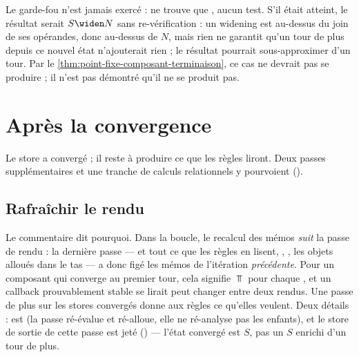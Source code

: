 \begin{piege}
Le garde-fou n'est jamais exercé :  ne trouve
que , aucun test. S'il était atteint,
le résultat serait $S \widen N$ sans re-vérification : un widening est
au-dessus du join de ses opérandes, donc au-dessus de $N$, mais rien ne
garantit qu'un tour de plus depuis ce nouvel état n'ajouterait rien ; le
résultat pourrait sous-approximer d'un tour. Par le
\cref{thm:point-fixe-composant-terminaison}, ce cas ne devrait pas se
produire ; il n'est pas démontré qu'il ne se produit pas.
\end{piege}

\section{Après la convergence}
\label{sec:point-fixe-composant-post}

Le store a convergé ; il reste à produire ce que les règles liront. Deux
passes supplémentaires et une tranche de calculs relationnels y pourvoient
().

\subsection{Rafraîchir le rendu}


Le commentaire dit pourquoi. Dans la boucle, le recalcul des mémos
\emph{suit} la passe de rendu : la dernière passe --- et tout ce que les
règles en lisent, , , les objets alloués
dans le tas --- a donc figé les mémos de l'itération \emph{précédente}. Pour
un composant qui converge au premier tour, cela signifie $\Top$ pour chaque
, et un callback prouvablement stable se lirait \og peut
changer entre deux rendus\fg. Une passe de plus sur les stores convergés
donne aux règles ce qu'elles veulent. Deux détails :  est
 (la passe ré-évalue et ré-alloue, elle ne ré-analyse pas les
enfants), et le store de sortie de cette passe est jeté
() --- l'état convergé est $S$, pas un $S$ enrichi
d'un tour de plus.

